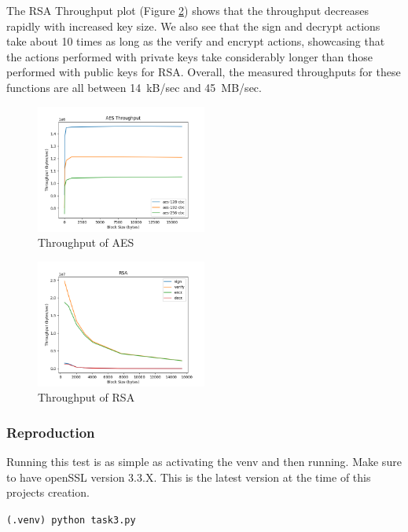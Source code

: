 \documentclass[11pt]{article}
\begin{document}
The RSA Throughput plot (Figure \ref{fig:rsa}) shows that the throughput decreases rapidly with increased key size. We also see that the sign and decrypt actions take about 10 times as long as the verify and encrypt actions, showcasing that the actions performed with private keys take considerably longer than those performed with public keys for RSA. Overall, the measured throughputs for these functions are all between 14~kB/sec and 45~MB/sec.

\begin{figure}[!ht]
	\centering
	\includegraphics[width=0.5\textwidth]{./assets/aes.png}
	\caption{Throughput of AES}
	\label{fig:aes}
\end{figure}

\begin{figure}[!ht]
	\centering
	\includegraphics[width=0.5\textwidth]{./assets/rsa.png}
	\caption{Throughput of RSA}
	\label{fig:rsa}
\end{figure}

\subsubsection*{Reproduction}

Running this test is as simple as activating the venv and then running. Make sure to have openSSL version 3.3.X. This is the latest version at the time of this projects creation. 

\verb|(.venv) python task3.py|

\end{document}
